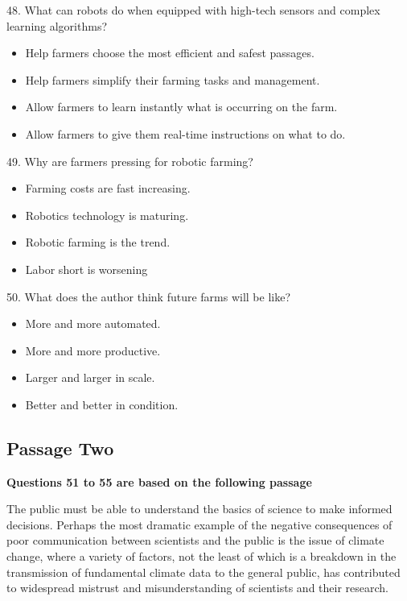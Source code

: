 \documentclass[UTF8,11pt]{ctexart}
\begin{document}
48. What can robots do when equipped with high-tech sensors and complex learning algorithms?


\begin{itemize}[leftmargin=2em,itemsep=.2em,topsep=.4em]\item[A.] Help farmers choose the most efficient and safest passages.
\item[B.] Help farmers simplify their farming tasks and management.
\item[C.] Allow farmers to learn instantly what is occurring on the farm.
\item[D.] Allow farmers to give them real-time instructions on what to do.
\end{itemize}

49. Why are farmers pressing for robotic farming?


\begin{itemize}[leftmargin=2em,itemsep=.2em,topsep=.4em]\item[A.] Farming costs are fast increasing.
\item[B.] Robotics technology is maturing.
\item[C.] Robotic farming is the trend.
\item[D.] Labor short is worsening
\end{itemize}

50. What does the author think future farms will be like?


\begin{itemize}[leftmargin=2em,itemsep=.2em,topsep=.4em]\item[A.] More and more automated.
\item[B.] More and more productive.
\item[C.] Larger and larger in scale.
\item[D.] Better and better in condition.
\end{itemize}

\subsection*{\textbf{Passage Two}}


\textbf{Questions 51 to 55 are based on the following passage}


The public must be able to understand the basics of science to make informed decisions. Perhaps the most dramatic example of the negative consequences of poor communication between scientists and the public is the issue of climate change, where a variety of factors, not the least of which is a breakdown in the transmission of fundamental climate data to the general public, has contributed to widespread mistrust and misunderstanding of scientists and their research.
\end{document}
